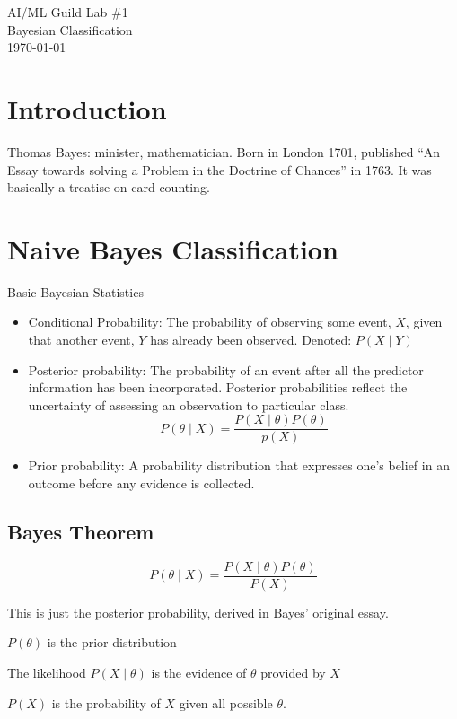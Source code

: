 \documentclass[letterpaper,12pt]{article}
\begin{document}
\begin{flushleft}
AI/ML Guild Lab \#1\\
Bayesian Classification\\
\today \\
\end{flushleft}

\section{Introduction}

Thomas Bayes: minister, mathematician. Born in London 1701, published ``An Essay
towards solving a Problem in the Doctrine of Chances'' in 1763. It was basically
a treatise on card counting.

\section{Naive Bayes Classification}

Basic Bayesian Statistics
\begin{itemize}
    \item Conditional Probability: The probability of observing some event, $X$,
        given that another event, $Y$ has already been observed. Denoted: $P(X \mid Y)$
    \item Posterior probability: The probability of an event after all the
        predictor information has been incorporated. Posterior probabilities
        reflect the uncertainty of assessing an observation to particular class.
        \[ P(\theta \mid X) = \frac{P(X \mid \theta)P(\theta)}{p(X)} \]
    \item Prior probability: A probability distribution that expresses one's
        belief in an outcome before any evidence is collected.
\end{itemize}

\subsection{Bayes Theorem}

\[
    P(\theta \mid X) = \frac{P(X \mid \theta)P(\theta)}{P(X)}
\]

This is just the posterior probability, derived in Bayes' original essay.

$P(\theta)$ is the prior distribution

The likelihood $P(X \mid \theta)$ is the evidence of $\theta$ provided by $X$

$P(X)$ is the probability of $X$ given all possible $\theta$.
\end{document}
